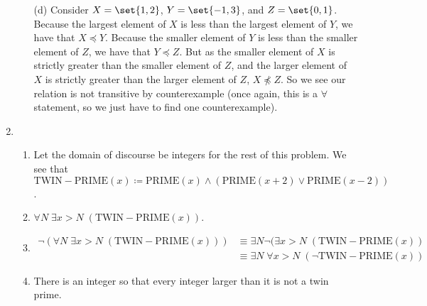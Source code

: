 \documentclass[12pt]{article}
\theoremstyle{definition}
\theoremstyle{remark}
\newcommand\setItemnumber[1]{\setcounter{enumi}{\numexpr#1-1\relax}}
\begin{document}
\begin{enumerate}[leftmargin=\labelsep]
\begin{enumerate}
			\item[(d)] Consider $X = \set{1, 2}$, $Y = \set{-1, 3}$, and $Z = \set{0, 1}$. Because the largest element of $X$ is less than the largest element of $Y$, we have that $X \preceq Y$. Because the smaller element of $Y$ is less than the smaller element of $Z$, we have that $Y \preceq Z$. But as the smaller element of $X$ is strictly greater than the smaller element of $Z$, and the larger element of $X$ is strictly greater than the larger element of $Z$, $X \not \preceq Z$. So we see our relation is not transitive by counterexample (once again, this is a $\forall$ statement, so we just have to find one counterexample).
		\end{enumerate}
	
		\newpage
		\setItemnumber{5}
		\item 
		\begin{enumerate}
			\item Let the domain of discourse be integers for the rest of this problem. We see that $\mathrm{TWIN-PRIME}(x) \coloneqq \mathrm{PRIME}(x) \land (\mathrm{PRIME}(x+2) \lor \mathrm{PRIME}(x-2))$.
			\item $\forall N \; \exists x > N \; (\mathrm{TWIN-PRIME}(x))$.
			\item \begin{align*}
				\lnot (\forall N \; \exists x > N \; (\mathrm{TWIN-PRIME}(x))) &\equiv \exists N \lnot(\exists x > N \; (\mathrm{TWIN-PRIME}(x)) \\
				&\equiv \exists N  \; \forall x > N \; (\lnot \mathrm{TWIN-PRIME}(x))
			\end{align*}
			\item There is an integer so that every integer larger than it is not a twin prime.
		\end{enumerate}
	

\end{enumerate}
\end{document}
